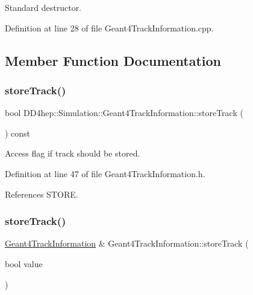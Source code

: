 Standard destructor. 



Definition at line 28 of file Geant4\+Track\+Information.\+cpp.



\subsection{Member Function Documentation}
\hypertarget{class_d_d4hep_1_1_simulation_1_1_geant4_track_information_ab1e007f0d526812b4353f81e4d64fa5c}{}\label{class_d_d4hep_1_1_simulation_1_1_geant4_track_information_ab1e007f0d526812b4353f81e4d64fa5c} 
\subsubsection{\texorpdfstring{store\+Track()}{storeTrack()}\hspace{0.1cm}{\footnotesize\ttfamily [1/2]}}
{\footnotesize\ttfamily bool D\+D4hep\+::\+Simulation\+::\+Geant4\+Track\+Information\+::store\+Track (\begin{DoxyParamCaption}{ }\end{DoxyParamCaption}) const\hspace{0.3cm}{\ttfamily [inline]}}



Access flag if track should be stored. 



Definition at line 47 of file Geant4\+Track\+Information.\+h.



References S\+T\+O\+RE.

\hypertarget{class_d_d4hep_1_1_simulation_1_1_geant4_track_information_a91857ec9a2cddd66aeac8e5de17cbe4a}{}\label{class_d_d4hep_1_1_simulation_1_1_geant4_track_information_a91857ec9a2cddd66aeac8e5de17cbe4a} 
\subsubsection{\texorpdfstring{store\+Track()}{storeTrack()}\hspace{0.1cm}{\footnotesize\ttfamily [2/2]}}
{\footnotesize\ttfamily \hyperlink{class_d_d4hep_1_1_simulation_1_1_geant4_track_information}{Geant4\+Track\+Information} \& Geant4\+Track\+Information\+::store\+Track (\begin{DoxyParamCaption}\item[{bool}]{value }\end{DoxyParamCaption})}



